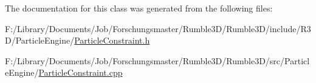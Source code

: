 The documentation for this class was generated from the following files\+:\begin{DoxyCompactItemize}
\item 
F\+:/\+Library/\+Documents/\+Job/\+Forschungsmaster/\+Rumble3\+D/\+Rumble3\+D/include/\+R3\+D/\+Particle\+Engine/\hyperlink{_particle_constraint_8h}{Particle\+Constraint.\+h}\item 
F\+:/\+Library/\+Documents/\+Job/\+Forschungsmaster/\+Rumble3\+D/\+Rumble3\+D/src/\+Particle\+Engine/\hyperlink{_particle_constraint_8cpp}{Particle\+Constraint.\+cpp}\end{DoxyCompactItemize}

